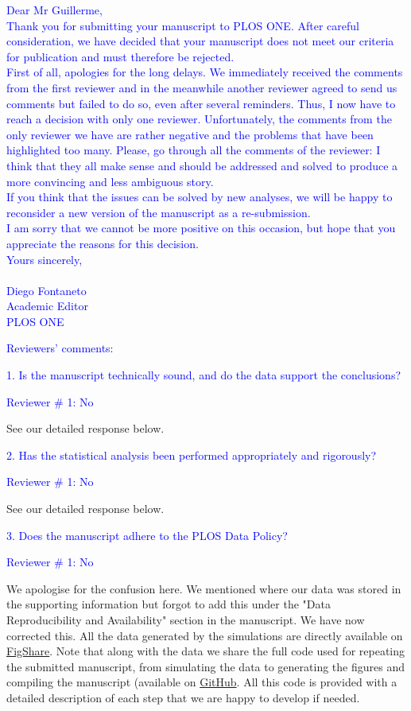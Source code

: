 \documentclass[11pt]{letter}
\begin{document}
\begin{letter}{}
\textcolor{blue}{
Dear Mr Guillerme, \\
Thank you for submitting your manuscript to PLOS ONE. After careful consideration, we have decided that your manuscript does not meet our criteria for publication and must therefore be rejected. \\
First of all, apologies for the long delays. We immediately received the comments from the first reviewer and in the meanwhile another reviewer agreed to send us comments but failed to do so, even after several reminders. Thus, I now have to reach a decision with only one reviewer.
Unfortunately, the comments from the only reviewer we have are rather negative and the problems that have been highlighted too many. Please, go through all the comments of the reviewer: I think that they all make sense and should be addressed and solved to produce a more convincing and less ambiguous story. \\
If you think that the issues can be solved by new analyses, we will be happy to reconsider a new version of the manuscript as a re-submission. \\
I am sorry that we cannot be more positive on this occasion, but hope that you appreciate the reasons for this decision. \\
Yours sincerely, \\ \\
Diego Fontaneto \\ 
Academic Editor \\
PLOS ONE}

\textcolor{blue}{Reviewers' comments:}

\textcolor{blue}{1. Is the manuscript technically sound, and do the data support the conclusions?}

\textcolor{blue}{Reviewer $\#$ 1: No}

See our detailed response below.

\textcolor{blue}{2. Has the statistical analysis been performed appropriately and rigorously?}

\textcolor{blue}{Reviewer $\#$ 1: No}

See our detailed response below.

\textcolor{blue}{3. Does the manuscript adhere to the PLOS Data Policy?}

\textcolor{blue}{Reviewer $\#$ 1: No}

We apologise for the confusion here. We mentioned where our data was stored in the supporting information but forgot to add this under the "Data Reproducibility and Availability" section in the manuscript. We have now corrected this. 
All the data generated by the simulations are directly available on \href{http://figshare.com/articles/Effect_of_missing_data_on_topological_inference_using_a_total_evidence_approach/1306861}{FigShare}. %
Note that along with the data we share the full code used for repeating the submitted manuscript, from simulating the data to generating the figures and compiling the manuscript (available on \href{https://github.com/TGuillerme/Total_Evidence_Method-Missing_data}{GitHub}. %
All this code is provided with a detailed description of each step that we are happy to develop if needed.


\end{letter}
\end{document}
